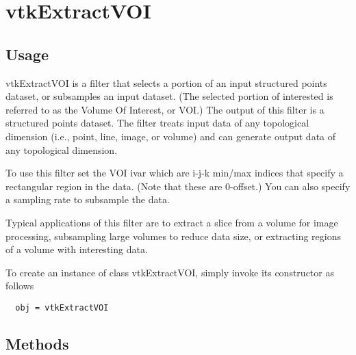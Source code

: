 \section{vtkExtractVOI}

\subsection{Usage}

 vtkExtractVOI is a filter that selects a portion of an input structured
 points dataset, or subsamples an input dataset. (The selected portion of
 interested is referred to as the Volume Of Interest, or VOI.) The output of
 this filter is a structured points dataset. The filter treats input data
 of any topological dimension (i.e., point, line, image, or volume) and can
 generate output data of any topological dimension.

 To use this filter set the VOI ivar which are i-j-k min/max indices that
 specify a rectangular region in the data. (Note that these are 0-offset.)
 You can also specify a sampling rate to subsample the data.

 Typical applications of this filter are to extract a slice from a volume
 for image processing, subsampling large volumes to reduce data size, or
 extracting regions of a volume with interesting data.

To create an instance of class vtkExtractVOI, simply
invoke its constructor as follows
\begin{verbatim}
  obj = vtkExtractVOI
\end{verbatim}
\subsection{Methods}

